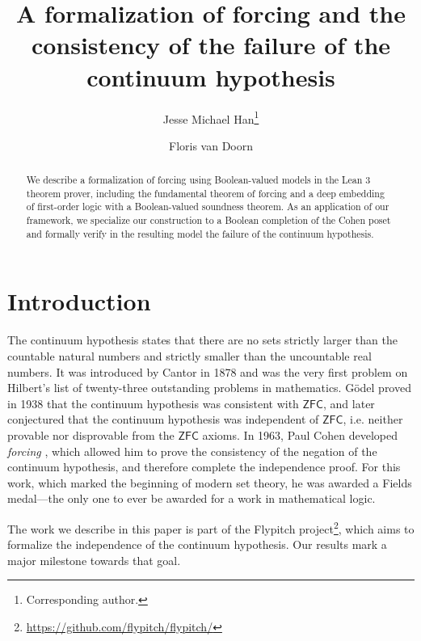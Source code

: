 \documentclass[a4paper,USenglish,cleveref, autoref]{lipics-v2019}
\title{A formalization of forcing and the consistency of the failure of the continuum hypothesis} %
\author{Jesse Michael Han\footnote{Corresponding author.}}{Department of Mathematics, University of Pittsburgh \and \url{https://www.pitt.edu/~jmh288}}{jessemichaelhan@gmail.com}{}{}%
\author{Floris van Doorn}{Department of Mathematics, University of Pittsburgh \and \url{http://florisvandoorn.com/}}{fpvdoorn@gmail.com}{}{}
\theoremstyle{definition}
\begin{document}
\maketitle

\begin{abstract}
We describe a formalization of forcing using Boolean-valued models in the Lean 3 theorem prover, including the fundamental theorem of forcing and a deep embedding of first-order logic with a Boolean-valued soundness theorem. As an application of our framework, we specialize our construction to a Boolean completion of the Cohen poset and formally verify in the resulting model the failure of the continuum hypothesis.
\end{abstract}

\section*{Introduction}
The continuum hypothesis states that there are no sets strictly larger than the countable natural numbers and strictly smaller than the uncountable real numbers. It was introduced by Cantor in 1878 \cite{cantor1878continuumhypothesis} and was the very first problem on Hilbert's list of twenty-three outstanding problems in mathematics. G\"odel proved in 1938 \cite{godel1938consistency} that the continuum hypothesis was consistent with $\mathsf{ZFC}$, and later conjectured that the continuum hypothesis was independent of $\mathsf{ZFC}$, i.e. neither provable nor disprovable from the $\mathsf{ZFC}$ axioms. In 1963, Paul Cohen developed \emph{forcing} \cite{cohen-the-independence-of-the-continuum-hypothesis-1}, which allowed him to prove the consistency of the negation of the continuum hypothesis, and therefore complete the independence proof. For this work, which marked the beginning of modern set theory, he was awarded a Fields medal---the only one to ever be awarded for a work in mathematical logic.

The work we describe in this paper is part of the Flypitch project\footnote{\url{https://github.com/flypitch/flypitch/}}, which aims to formalize the independence of the continuum hypothesis. Our results mark a major milestone towards that goal.
\end{document}
